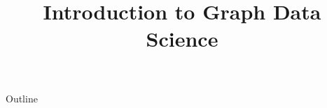 \documentclass[xcolor=dvipsnames,compress,t,pdf,9pt]{beamer}
\title[\insertframenumber /\inserttotalframenumber]{Introduction to Graph Data Science}
\begin{document}
	\begin{frame}
	\titlepage
	\end{frame}
	
	\begin{frame}{Outline}
	    \tableofcontents
	\end{frame}

	
	
	
\end{document}
